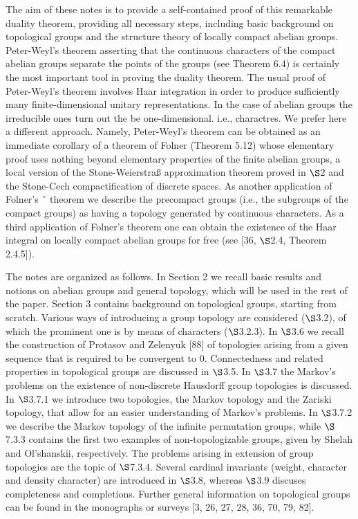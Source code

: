 \documentclass[12pt]{article}
\begin{document}
        The aim of these notes is to provide a self-contained proof of this remarkable duality theorem, providing all
    necessary steps, including basic background on topological groups and the structure theory of locally compact
    abelian groups. Peter-Weyl's theorem asserting that the continuous characters of the compact abelian groups
    separate the points of the groups (see Theorem 6.4) is certainly the most important tool in proving the duality
    theorem. The usual proof of Peter-Weyl's theorem involves Haar integration in order to produce sufficiently
    many finite-dimensional unitary representations. In the case of abelian groups the irreducible ones turn out the
    be one-dimensional. i.e., charactres. We prefer here a different approach. Namely, Peter-Weyl's theorem can be
    obtained as an immediate corollary of a theorem of Folner (Theorem 5.12) whose elementary proof uses nothing
    beyond elementary properties of the finite abelian groups, a local version of the Stone-Weierstraß approximation
    theorem proved in $ \S $2 and the Stone-Cech compactification of discrete spaces. As another application of Folner's ˇ
    theorem we describe the precompact groups (i.e., the subgroups of the compact groups) as having a topology
    generated by continuous characters. As a third application of Folner's theorem one can obtain the existence of
    the Haar integral on locally compact abelian groups for free (see [36, $ \S $2.4, Theorem 2.4.5]).
        

        The notes are organized as follows. In Section 2 we recall basic results and notions on abelian groups and
    general topology, which will be used in the rest of the paper. Section 3 contains background on topological
    groups, starting from scratch. Various ways of introducing a group topology are considered ($ \S $3.2), of which the
    prominent one is by means of characters ($ \S $3.2.3). In $ \S $3.6 we recall the construction of Protasov and Zelenyuk
    [88] of topologies arising from a given sequence that is required to be convergent to 0. Connectedness and
    related properties in topological groups are discussed in $ \S $3.5. In $ \S $3.7 the Markov's problems on the existence
    of non-discrete Hausdorff group topologies is discussed. In $ \S $3.7.1 we introduce two topologies, the Markov
    topology and the Zariski topology, that allow for an easier understanding of Markov's problems. In $ \S $3.7.2 we
    describe the Markov topology of the infinite permutation groups, while $ \S $7.3.3 contains the first two examples
    of non-topologizable groups, given by Shelah and Ol'shanskii, respectively. The problems arising in extension
    of group topologies are the topic of $ \S $7.3.4. Several cardinal invariants (weight, character and density character)
    are introduced in $ \S $3.8, whereas $ \S $3.9 discuses completeness and completions. Further general information on
    topological groups can be found in the monographs or surveys [3, 26, 27, 28, 36, 70, 79, 82].
    
\end{document}
